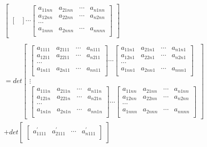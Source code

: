\documentclass[twoside,a4paper,CCT]{cctart}   %
\begin{document}
\begin{list}{}
\begin{align*}
\begin{bmatrix}
\begin{bmatrix}
  \end{bmatrix}
\cdots
\begin{bmatrix}
  a_{11nn}& a_{21nn}&\cdots&a_{n1nn}\\
  a_{12nn}& a_{22nn}&\cdots&a_{n2nn}\\
   \cdots\\
   a_{1nnn}& a_{2nnn}&\cdots&a_{nnnn}\\
\end{bmatrix}
\end{bmatrix}\\
\\
=det\begin{bmatrix}
 \begin{bmatrix}
   a_{1111}& a_{2111}&\cdots&a_{n111}\\
   a_{1211}& a_{2211}&\cdots&a_{n211}\\
 \cdots\\
a_{1n11}& a_{2n11}&\cdots&a_{nn11}\\
\end{bmatrix}
\cdots
\begin{bmatrix}
  a_{11n1}& a_{21n1}&\cdots&a_{n1n1}\\
  a_{12n1}& a_{22n1}&\cdots&a_{n2n1}\\
 \cdots\\
 a_{1nn1}& a_{2nn1}&\cdots&a_{nnn1}\\
 \end{bmatrix}\\
\vdots\\
\begin{bmatrix}
  a_{111n}& a_{211n}&\cdots&a_{n11n}\\
  a_{121n}& a_{221n}&\cdots&a_{n21n}\\
   \cdots\\
   a_{1n1n}& a_{2n1n}&\cdots&a_{nn1n}\\
   \end{bmatrix}
\cdots
\begin{bmatrix}
  a_{11nn}& a_{21nn}&\cdots&a_{n1nn}\\
  a_{12nn}& a_{22nn}&\cdots&a_{n2nn}\\
   \cdots\\
   a_{1nnn}& a_{2nnn}&\cdots&a_{nnnn}\\
   \end{bmatrix}
    \end{bmatrix}
  \\+det
  \begin{bmatrix}
 \begin{bmatrix}
   a_{1111}^{'}& a_{2111}^{'}&\cdots&a_{n111}^{'}\\

\end{bmatrix}
\end{bmatrix}
\end{align*}
\end{list}
\end{document}
